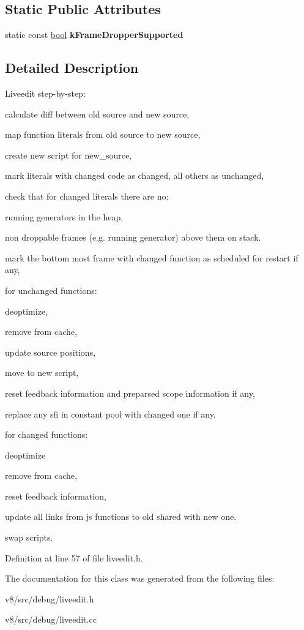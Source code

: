 \subsection*{Static Public Attributes}
\begin{DoxyCompactItemize}
\item 
\mbox{\label{classv8_1_1internal_1_1LiveEdit_a065987e52e8dd61f79875776a2ffe141}} 
static const \mbox{\hyperlink{classbool}{bool}} {\bfseries k\+Frame\+Dropper\+Supported}
\end{DoxyCompactItemize}


\subsection{Detailed Description}
Liveedit step-\/by-\/step\+:
\begin{DoxyEnumerate}
\item calculate diff between old source and new source,
\item map function literals from old source to new source,
\item create new script for new\+\_\+source,
\item mark literals with changed code as changed, all others as unchanged,
\item check that for changed literals there are no\+:
\begin{DoxyItemize}
\item running generators in the heap,
\item non droppable frames (e.\+g. running generator) above them on stack.
\end{DoxyItemize}
\item mark the bottom most frame with changed function as scheduled for restart if any,
\item for unchanged functions\+:
\begin{DoxyItemize}
\item deoptimize,
\item remove from cache,
\item update source positions,
\item move to new script,
\item reset feedback information and preparsed scope information if any,
\item replace any sfi in constant pool with changed one if any.
\end{DoxyItemize}
\item for changed functions\+:
\begin{DoxyItemize}
\item deoptimize
\item remove from cache,
\item reset feedback information,
\item update all links from js functions to old shared with new one.
\end{DoxyItemize}
\item swap scripts. 
\end{DoxyEnumerate}

Definition at line 57 of file liveedit.\+h.



The documentation for this class was generated from the following files\+:\begin{DoxyCompactItemize}
\item 
v8/src/debug/liveedit.\+h\item 
v8/src/debug/liveedit.\+cc\end{DoxyCompactItemize}
